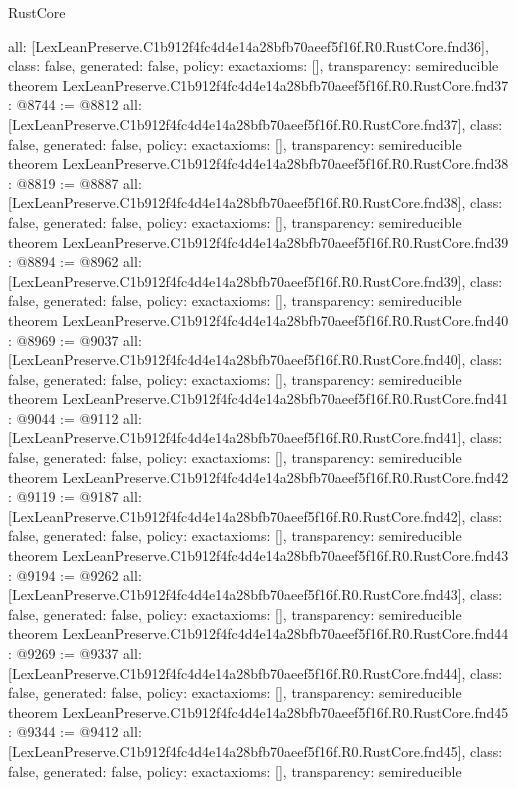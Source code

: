 \begin{lexlean}{RustCore}
\begin{coremodule}
{  all: [LexLeanPreserve.C1b912f4fc4d4e14a28bfb70aeef5f16f.R0.RustCore.fnd36],
  class: false,
  generated: false,
  policy: exact{axioms: []},
  transparency: semireducible
}
theorem LexLeanPreserve.C1b912f4fc4d4e14a28bfb70aeef5f16f.R0.RustCore.fnd37 : @8744 := @8812 {
  all: [LexLeanPreserve.C1b912f4fc4d4e14a28bfb70aeef5f16f.R0.RustCore.fnd37],
  class: false,
  generated: false,
  policy: exact{axioms: []},
  transparency: semireducible
}
theorem LexLeanPreserve.C1b912f4fc4d4e14a28bfb70aeef5f16f.R0.RustCore.fnd38 : @8819 := @8887 {
  all: [LexLeanPreserve.C1b912f4fc4d4e14a28bfb70aeef5f16f.R0.RustCore.fnd38],
  class: false,
  generated: false,
  policy: exact{axioms: []},
  transparency: semireducible
}
theorem LexLeanPreserve.C1b912f4fc4d4e14a28bfb70aeef5f16f.R0.RustCore.fnd39 : @8894 := @8962 {
  all: [LexLeanPreserve.C1b912f4fc4d4e14a28bfb70aeef5f16f.R0.RustCore.fnd39],
  class: false,
  generated: false,
  policy: exact{axioms: []},
  transparency: semireducible
}
theorem LexLeanPreserve.C1b912f4fc4d4e14a28bfb70aeef5f16f.R0.RustCore.fnd40 : @8969 := @9037 {
  all: [LexLeanPreserve.C1b912f4fc4d4e14a28bfb70aeef5f16f.R0.RustCore.fnd40],
  class: false,
  generated: false,
  policy: exact{axioms: []},
  transparency: semireducible
}
theorem LexLeanPreserve.C1b912f4fc4d4e14a28bfb70aeef5f16f.R0.RustCore.fnd41 : @9044 := @9112 {
  all: [LexLeanPreserve.C1b912f4fc4d4e14a28bfb70aeef5f16f.R0.RustCore.fnd41],
  class: false,
  generated: false,
  policy: exact{axioms: []},
  transparency: semireducible
}
theorem LexLeanPreserve.C1b912f4fc4d4e14a28bfb70aeef5f16f.R0.RustCore.fnd42 : @9119 := @9187 {
  all: [LexLeanPreserve.C1b912f4fc4d4e14a28bfb70aeef5f16f.R0.RustCore.fnd42],
  class: false,
  generated: false,
  policy: exact{axioms: []},
  transparency: semireducible
}
theorem LexLeanPreserve.C1b912f4fc4d4e14a28bfb70aeef5f16f.R0.RustCore.fnd43 : @9194 := @9262 {
  all: [LexLeanPreserve.C1b912f4fc4d4e14a28bfb70aeef5f16f.R0.RustCore.fnd43],
  class: false,
  generated: false,
  policy: exact{axioms: []},
  transparency: semireducible
}
theorem LexLeanPreserve.C1b912f4fc4d4e14a28bfb70aeef5f16f.R0.RustCore.fnd44 : @9269 := @9337 {
  all: [LexLeanPreserve.C1b912f4fc4d4e14a28bfb70aeef5f16f.R0.RustCore.fnd44],
  class: false,
  generated: false,
  policy: exact{axioms: []},
  transparency: semireducible
}
theorem LexLeanPreserve.C1b912f4fc4d4e14a28bfb70aeef5f16f.R0.RustCore.fnd45 : @9344 := @9412 {
  all: [LexLeanPreserve.C1b912f4fc4d4e14a28bfb70aeef5f16f.R0.RustCore.fnd45],
  class: false,
  generated: false,
  policy: exact{axioms: []},
  transparency: semireducible
}
\end{coremodule}
\end{lexlean}
